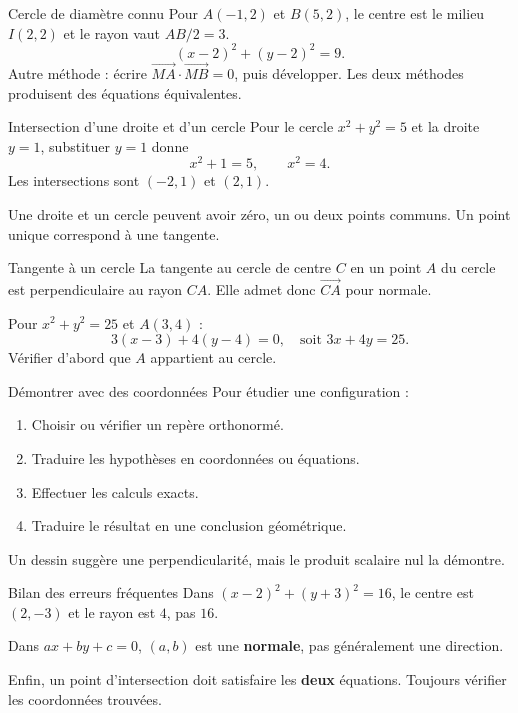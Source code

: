 \documentclass[aspectratio=169,12pt]{beamer}
\begin{document}
\renewcommand{\slidekind}{COMPRENDRE}
\begin{frame}[t,fragile]{Cercle de diamètre connu}
Pour $A(-1,2)$ et $B(5,2)$, le centre est le milieu $I(2,2)$ et le rayon vaut $AB/2=3$.\[\boxed{(x-2)^2+(y-2)^2=9}.\]Autre méthode : écrire $\overrightarrow{MA}\cdot\overrightarrow{MB}=0$, puis développer. Les deux méthodes produisent des équations équivalentes.
\end{frame}
\renewcommand{\slidekind}{COMPRENDRE}
\begin{frame}[t,fragile]{Intersection d’une droite et d’un cercle}
Pour le cercle $x^2+y^2=5$ et la droite $y=1$, substituer $y=1$ donne\[x^2+1=5,\qquad x^2=4.\]Les intersections sont $(-2,1)$ et $(2,1)$.\medskip\par Une droite et un cercle peuvent avoir zéro, un ou deux points communs. Un point unique correspond à une tangente.
\end{frame}
\renewcommand{\slidekind}{COMPRENDRE}
\begin{frame}[t,fragile]{Tangente à un cercle}
La tangente au cercle de centre $C$ en un point $A$ du cercle est perpendiculaire au rayon $CA$. Elle admet donc $\overrightarrow{CA}$ pour normale.\medskip\par Pour $x^2+y^2=25$ et $A(3,4)$ :\[3(x-3)+4(y-4)=0,\quad\text{soit }3x+4y=25.\]Vérifier d’abord que $A$ appartient au cercle.
\end{frame}
\renewcommand{\slidekind}{COMPRENDRE}
\begin{frame}[t,fragile]{Démontrer avec des coordonnées}
Pour étudier une configuration :\begin{enumerate}\item Choisir ou vérifier un repère orthonormé.\item Traduire les hypothèses en coordonnées ou équations.\item Effectuer les calculs exacts.\item Traduire le résultat en une conclusion géométrique.\end{enumerate}Un dessin suggère une perpendicularité, mais le produit scalaire nul la démontre.
\end{frame}
\renewcommand{\slidekind}{À RETENIR}
\begin{frame}[t,fragile]{Bilan des erreurs fréquentes}
Dans $(x-2)^2+(y+3)^2=16$, le centre est $(2,-3)$ et le rayon est $4$, pas $16$.\medskip\par Dans $ax+by+c=0$, $(a,b)$ est une \textbf{normale}, pas généralement une direction.\medskip\par Enfin, un point d’intersection doit satisfaire les \textbf{deux} équations. Toujours vérifier les coordonnées trouvées.
\end{frame}
\end{document}
